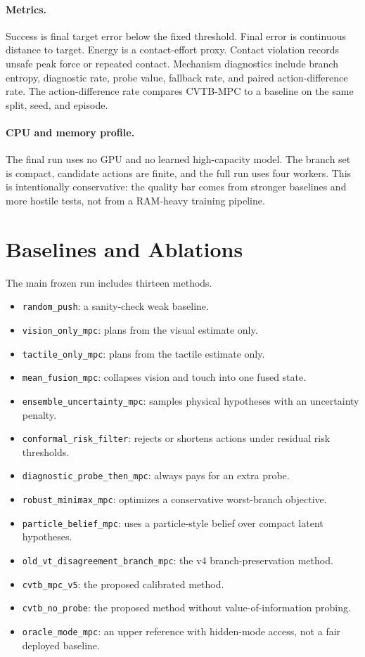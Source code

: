 \documentclass{article}
\newcommand{\method}{\textsc{CVTB-MPC}}
\begin{document}
\paragraph{Metrics.}
Success is final target error below the fixed threshold. Final error is continuous distance to target. Energy is a contact-effort proxy. Contact violation records unsafe peak force or repeated contact. Mechanism diagnostics include branch entropy, diagnostic rate, probe value, fallback rate, and paired action-difference rate. The action-difference rate compares \method{} to a baseline on the same split, seed, and episode.

\paragraph{CPU and memory profile.}
The final run uses no GPU and no learned high-capacity model. The branch set is compact, candidate actions are finite, and the full run uses four workers. This is intentionally conservative: the quality bar comes from stronger baselines and more hostile tests, not from a RAM-heavy training pipeline.

\section{Baselines and Ablations}

The main frozen run includes thirteen methods.
\begin{itemize}
  \item \texttt{random\_push}: a sanity-check weak baseline.
  \item \texttt{vision\_only\_mpc}: plans from the visual estimate only.
  \item \texttt{tactile\_only\_mpc}: plans from the tactile estimate only.
  \item \texttt{mean\_fusion\_mpc}: collapses vision and touch into one fused state.
  \item \texttt{ensemble\_uncertainty\_mpc}: samples physical hypotheses with an uncertainty penalty.
  \item \texttt{conformal\_risk\_filter}: rejects or shortens actions under residual risk thresholds.
  \item \texttt{diagnostic\_probe\_then\_mpc}: always pays for an extra probe.
  \item \texttt{robust\_minimax\_mpc}: optimizes a conservative worst-branch objective.
  \item \texttt{particle\_belief\_mpc}: uses a particle-style belief over compact latent hypotheses.
  \item \texttt{old\_vt\_disagreement\_branch\_mpc}: the v4 branch-preservation method.
  \item \texttt{cvtb\_mpc\_v5}: the proposed calibrated method.
  \item \texttt{cvtb\_no\_probe}: the proposed method without value-of-information probing.
  \item \texttt{oracle\_mode\_mpc}: an upper reference with hidden-mode access, not a fair deployed baseline.
\end{itemize}
\end{document}
